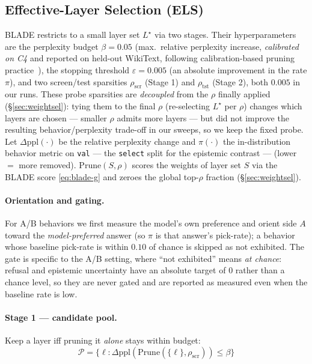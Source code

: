 \subsection{Effective-Layer Selection (ELS)}
\label{sec:els}
BLADE restricts to a small layer set $L^\star$ via two stages. Their hyperparameters are the perplexity budget $\beta=0.05$ (max.\ relative perplexity increase, \emph{calibrated on C4} and reported on held-out WikiText, following calibration-based pruning practice~\cite{sun2023wanda,frantar2023sparsegpt}), the stopping threshold $\varepsilon=0.005$ (an absolute improvement in the rate $\pi$), and two screen/test sparsities $\rho_{\text{scr}}$ (Stage 1) and $\rho_{\text{tst}}$ (Stage 2), both $0.005$ in our runs. These probe sparsities are \emph{decoupled} from the $\rho$ finally applied (\S\ref{sec:weightsel}): tying them to the final $\rho$ (re-selecting $L^\star$ per $\rho$) changes which layers are chosen --- smaller $\rho$ admits more layers --- but did not improve the resulting behavior/perplexity trade-off in our sweeps, so we keep the fixed probe. Let $\Delta\mathrm{ppl}(\cdot)$ be the relative perplexity change and $\pi(\cdot)$ the in-distribution behavior metric on \texttt{val} --- the \texttt{select} split for the epistemic contrast --- (lower $=$ more removed). $\mathrm{Prune}(S,\rho)$ scores the weights of layer set $S$ via the BLADE score \eqref{eq:blade-g} and zeroes the global top-$\rho$ fraction (\S\ref{sec:weightsel}).

\paragraph{Orientation and gating.} For A/B behaviors we first measure the model's own preference and orient side $A$ toward the \emph{model-preferred} answer (so $\pi$ is that answer's pick-rate); a behavior whose baseline pick-rate is within $0.10$ of chance is skipped as not exhibited. The gate is specific to the A/B setting, where ``not exhibited'' means \emph{at chance}: refusal and epistemic uncertainty have an absolute target of $0$ rather than a chance level, so they are never gated and are reported as measured even when the baseline rate is low.

\paragraph{Stage 1 --- candidate pool.} Keep a layer iff pruning it \emph{alone} stays within budget:
\begin{equation}
    \mathcal{P}=\{\ell:\Delta\mathrm{ppl}(\mathrm{Prune}(\{\ell\},\rho_{\text{scr}}))\le\beta\}
\end{equation}
